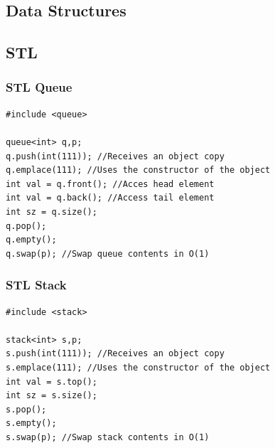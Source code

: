 \documentclass[twoside]{article}
\begin{document}
\selectfont
    \begin{multicols*}{2}
    \color{coolgray}
        \tableofcontents
        \newpage
\sectionfont{\bfseries\sffamily\centering\Huge}
\vspace{1em}
\section*{Data Structures}
\vspace{3em}
\subsectionfont{\bfseries\sffamily\centering\LARGE}
\vspace{0em}
\subsection*{STL}
\vspace{2em}
\subsubsectionfont{\large\bfseries\sffamily\underline}
\subsubsection*{STL Queue}
\begin{verbatim}
#include <queue>

queue<int> q,p;
q.push(int(111)); //Receives an object copy
q.emplace(111); //Uses the constructor of the object
int val = q.front(); //Acces head element
int val = q.back(); //Access tail element
int sz = q.size();
q.pop();
q.empty();
q.swap(p); //Swap queue contents in O(1)

\end{verbatim}

\subsubsectionfont{\large\bfseries\sffamily\underline}
\subsubsection*{STL Stack}
\begin{verbatim}
#include <stack>

stack<int> s,p;
s.push(int(111)); //Receives an object copy
s.emplace(111); //Uses the constructor of the object
int val = s.top();
int sz = s.size();
s.pop();
s.empty();
s.swap(p); //Swap stack contents in O(1)

\end{verbatim}

\sectionfont{\bfseries\sffamily\centering\Huge}
\vspace{1em}

\end{multicols*}
\end{document}
